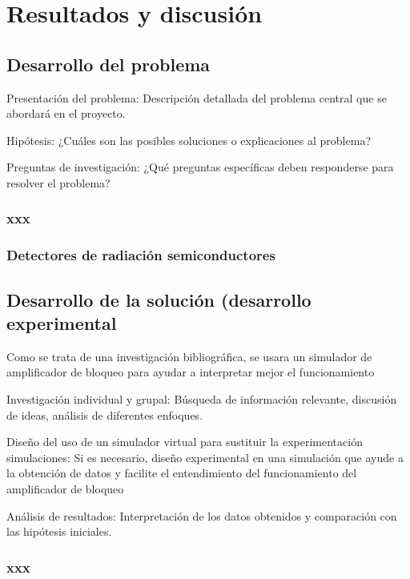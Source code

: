 \chapter*{Resultados  y discusión}
\blindtext
\section*{Desarrollo del problema} %

Presentación del problema: Descripción detallada del problema central que se abordará en el proyecto. 

Hipótesis: ¿Cuáles son las posibles soluciones o explicaciones al problema? 

Preguntas de investigación: ¿Qué preguntas específicas deben responderse para resolver el problema?

\subsection*{xxx}

\subsection*{Detectores de radiación semiconductores}
\section*{Desarrollo de la solución (desarrollo experimental} %

Como se trata de una investigación bibliográfica, se usara un simulador de amplificador de bloqueo para ayudar a interpretar mejor el funcionamiento

Investigación individual y grupal: Búsqueda de información relevante, discusión de ideas, análisis de diferentes enfoques. 

Diseño del uso de un simulador virtual para sustituir la experimentación simulaciones: Si es necesario, diseño experimental en una simulación que ayude a la obtención de datos y facilite el entendimiento del funcionamiento del amplificador de bloqueo

Análisis de resultados: Interpretación de los datos obtenidos y comparación con las hipótesis iniciales.

\subsection*{xxx}
\newpage